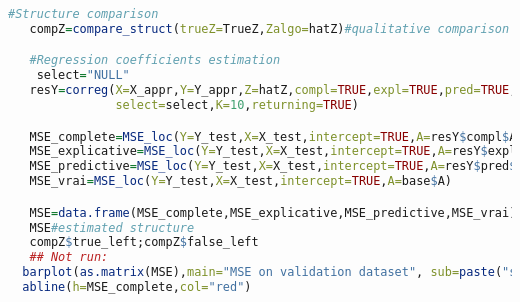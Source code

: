 \documentclass[12pt,a4paper]{report}
\begin{document}
\begin{appendices}
\begin{lstlisting}[language=R]
   #Structure comparison
   compZ=compare_struct(trueZ=TrueZ,Zalgo=hatZ)#qualitative comparison

   #Regression coefficients estimation
    select="NULL"
   resY=correg(X=X_appr,Y=Y_appr,Z=hatZ,compl=TRUE,expl=TRUE,pred=TRUE,
               select=select,K=10,returning=TRUE)

   MSE_complete=MSE_loc(Y=Y_test,X=X_test,intercept=TRUE,A=resY$compl$A)
   MSE_explicative=MSE_loc(Y=Y_test,X=X_test,intercept=TRUE,A=resY$expl$A)
   MSE_predictive=MSE_loc(Y=Y_test,X=X_test,intercept=TRUE,A=resY$pred$A)
   MSE_vrai=MSE_loc(Y=Y_test,X=X_test,intercept=TRUE,A=base$A)

   MSE=data.frame(MSE_complete,MSE_explicative,MSE_predictive,MSE_vrai)
   MSE#estimated structure
   compZ$true_left;compZ$false_left
   ## Not run: 
  barplot(as.matrix(MSE),main="MSE on validation dataset", sub=paste("select=",select))
  abline(h=MSE_complete,col="red")
\end{lstlisting}


\end{appendices}
\end{document}
